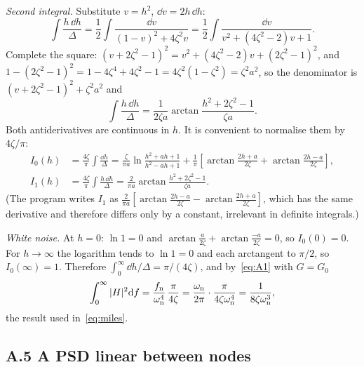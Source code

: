 \emph{Second integral.} Substitute $v = h^2$, $\dd v = 2h\,\dd h$:
\begin{equation}
  \int\frac{h\,\dd h}{\Delta} = \frac12\int\frac{\dd v}{(1-v)^2+4\zeta^2v} = \frac12\int\frac{\dd v}{v^2+(4\zeta^2-2)v+1}.
\end{equation}
Complete the square: $(v+2\zeta^2-1)^2 = v^2 + (4\zeta^2-2)v + (2\zeta^2-1)^2$, and
$1-(2\zeta^2-1)^2 = 1 - 4\zeta^4 + 4\zeta^2 - 1 = 4\zeta^2(1-\zeta^2) = \zeta^2a^2$, so the denominator
is $(v+2\zeta^2-1)^2 + \zeta^2a^2$ and
\begin{equation}\label{eq:A4}
  \int\frac{h\,\dd h}{\Delta} = \frac{1}{2\zeta a}\arctan\frac{h^2+2\zeta^2-1}{\zeta a}.
\end{equation}
Both antiderivatives are continuous in $h$. It is convenient to normalise them by $4\zeta/\pi$:
\begin{align}
  I_0(h) &= \frac{4\zeta}{\pi}\int\frac{\dd h}{\Delta}
  = \frac{\zeta}{\pi a}\ln\frac{h^2+ah+1}{h^2-ah+1} + \frac1\pi\left[\arctan\frac{2h+a}{2\zeta}+\arctan\frac{2h-a}{2\zeta}\right],\\
  I_1(h) &= \frac{4\zeta}{\pi}\int\frac{h\,\dd h}{\Delta} = \frac{2}{\pi a}\arctan\frac{h^2+2\zeta^2-1}{\zeta a}.
\end{align}
(The program writes $I_1$ as $\frac{2}{\pi a}[\arctan\frac{2h-a}{2\zeta}-\arctan\frac{2h+a}{2\zeta}]$,
which has the same derivative and therefore differs only by a constant, irrelevant in definite
integrals.)

\emph{White noise.} At $h=0$: $\ln1 = 0$ and $\arctan\frac{a}{2\zeta}+\arctan\frac{-a}{2\zeta} = 0$,
so $I_0(0) = 0$. For $h\to\infty$ the logarithm tends to $\ln1=0$ and each arctangent to $\pi/2$, so
$I_0(\infty) = 1$. Therefore $\int_0^\infty\dd h/\Delta = \pi/(4\zeta)$, and by~\eqref{eq:A1} with
$G = G_0$
\begin{equation}
  \int_0^\infty|H|^2\mathrm{d} f = \frac{f_{\mathrm{n}}}{\omega_{\mathrm{n}}^4}\,\frac{\pi}{4\zeta} = \frac{\omega_{\mathrm{n}}}{2\pi}\cdot\frac{\pi}{4\zeta\omega_{\mathrm{n}}^4}
  = \frac{1}{8\zeta\omega_{\mathrm{n}}^3},
\end{equation}
the result used in~\eqref{eq:miles}.

\subsection*{A.5 A PSD linear between nodes}

